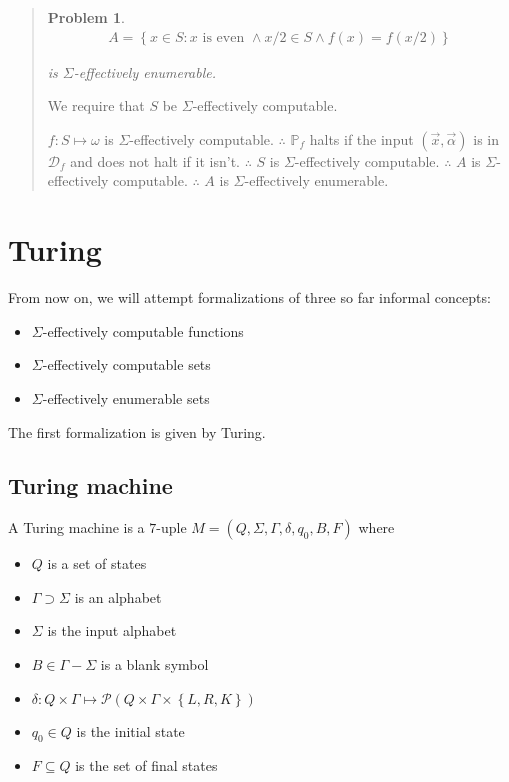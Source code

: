 \documentclass[a4paper, 12pt]{article}
\newtheorem{problem}{Problem}
\newtheorem{problem}{Problem}
\begin{document}
\begin{quote}
\begin{problem}
    \begin{align*}
        A = \left\{ x \in  S : x \text{ is even } \land x / 2 \in S \land f(x) = f(x
        / 2) \right\} 
    \end{align*}

    is $\Sigma$-effectively enumerable.
\end{problem}


We require that $S$ be $\Sigma$-effectively computable. 

$f : S \mapsto \omega$ is $\Sigma$-effectively computable. $\therefore $ $\mathbb{P}_f$ halts
if the input $(\vec{x}, \vec{\alpha}) $ is in $\mathcal{D}_f$ and does not halt
if it isn't. $\therefore $ $S$ is $\Sigma$-effectively computable. $\therefore $
$A$ is $\Sigma$-effectively computable. $\therefore $ $A$ is
$\Sigma$-effectively enumerable.



\end{quote}
\normalsize



\pagebreak
\section{Turing}

From now on, we will attempt formalizations of three so far informal concepts: 

\begin{itemize}
    \item $\Sigma$-effectively computable functions
    \item $\Sigma$-effectively computable sets
    \item $\Sigma$-effectively enumerable sets
\end{itemize}

The first formalization is given by Turing.

\subsection{Turing machine}

A Turing machine is a $7$-uple $M = \left( Q, \Sigma, \Gamma, \delta, q_0, B, F
\right) $ where

\begin{itemize}
    \item $Q$ is a set of states 
    \item $\Gamma \supset \Sigma$ is an alphabet
    \item $\Sigma$ is the input alphabet
    \item $B \in \Gamma - \Sigma$ is a blank symbol 
    \item $\delta : Q \times \Gamma \mapsto \mathcal{P} \left( Q \times \Gamma \times \left\{
        L, R, K\right\}  \right) $ 
    \item $q_0 \in Q$ is the initial state 
    \item $F \subseteq Q$ is the set of final states
\end{itemize}
\end{document}
